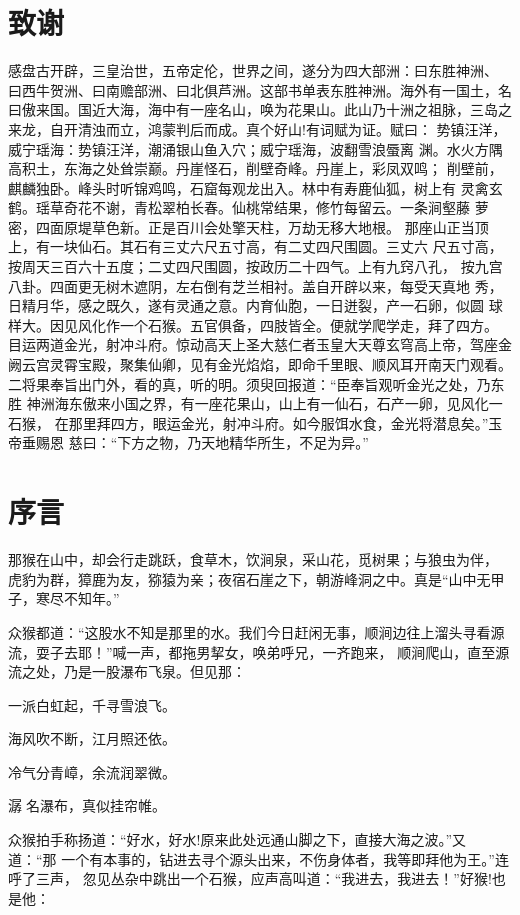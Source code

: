 \documentclass[]{style/zjuthesis}
\begin{document}
\chapter{致谢}

感盘古开辟，三皇治世，五帝定伦，世界之间，遂分为四大部洲：曰东胜神洲、
曰西牛贺洲、曰南赡部洲、曰北俱芦洲。这部书单表东胜神洲。海外有一国土，名
曰傲来国。国近大海，海中有一座名山，唤为花果山。此山乃十洲之祖脉，三岛之
来龙，自开清浊而立，鸿蒙判后而成。真个好山!有词赋为证。赋曰：
势镇汪洋，威宁瑶海：势镇汪洋，潮涌银山鱼入穴；威宁瑶海，波翻雪浪蜃离
渊。水火方隅高积土，东海之处耸崇巅。丹崖怪石，削壁奇峰。丹崖上，彩凤双鸣；
削壁前，麒麟独卧。峰头时听锦鸡鸣，石窟每观龙出入。林中有寿鹿仙狐，树上有
灵禽玄鹤。瑶草奇花不谢，青松翠柏长春。仙桃常结果，修竹每留云。一条涧壑藤
萝密，四面原堤草色新。正是百川会处擎天柱，万劫无移大地根。
那座山正当顶上，有一块仙石。其石有三丈六尺五寸高，有二丈四尺围圆。三丈六
尺五寸高，按周天三百六十五度；二丈四尺围圆，按政历二十四气。上有九窍八孔，
按九宫八卦。四面更无树木遮阴，左右倒有芝兰相衬。盖自开辟以来，每受天真地
秀，日精月华，感之既久，遂有灵通之意。内育仙胞，一日迸裂，产一石卵，似圆
球样大。因见风化作一个石猴。五官俱备，四肢皆全。便就学爬学走，拜了四方。
目运两道金光，射冲斗府。惊动高天上圣大慈仁者玉皇大天尊玄穹高上帝，驾座金
阙云宫灵霄宝殿，聚集仙卿，见有金光焰焰，即命千里眼、顺风耳开南天门观看。
二将果奉旨出门外，看的真，听的明。须臾回报道：``臣奉旨观听金光之处，乃东胜
神洲海东傲来小国之界，有一座花果山，山上有一仙石，石产一卵，见风化一石猴，
在那里拜四方，眼运金光，射冲斗府。如今服饵水食，金光将潜息矣。''玉帝垂赐恩
慈曰：``下方之物，乃天地精华所生，不足为异。''

\chapter{序言}

那猴在山中，却会行走跳跃，食草木，饮涧泉，采山花，觅树果；与狼虫为伴，
虎豹为群，獐鹿为友，猕猿为亲；夜宿石崖之下，朝游峰洞之中。真是``山中无甲
子，寒尽不知年。''

众猴都道：``这股水不知是那里的水。我们今日赶闲无事，顺涧边往上溜头寻看源流，耍子去耶！''喊一声，都拖男挈女，唤弟呼兄，一齐跑来，
顺涧爬山，直至源流之处，乃是一股瀑布飞泉。但见那：

一派白虹起，千寻雪浪飞。

海风吹不断，江月照还依。

冷气分青嶂，余流润翠微。

潺名瀑布，真似挂帘帷。

众猴拍手称扬道：``好水，好水!原来此处远通山脚之下，直接大海之波。''又道：``那
一个有本事的，钻进去寻个源头出来，不伤身体者，我等即拜他为王。''连呼了三声，
忽见丛杂中跳出一个石猴，应声高叫道：``我进去，我进去！''好猴!也是他：
\end{document}
